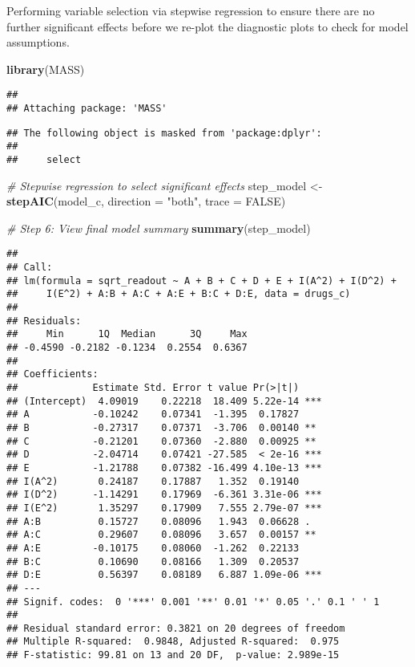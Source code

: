 \documentclass[
]{article}
\newenvironment{Shaded}{\begin{snugshade}}{\end{snugshade}}
\newcommand{\AttributeTok}[1]{\textcolor[rgb]{0.13,0.29,0.53}{#1}}
\newcommand{\CommentTok}[1]{\textcolor[rgb]{0.56,0.35,0.01}{\textit{#1}}}
\newcommand{\ConstantTok}[1]{\textcolor[rgb]{0.56,0.35,0.01}{#1}}
\newcommand{\FunctionTok}[1]{\textcolor[rgb]{0.13,0.29,0.53}{\textbf{#1}}}
\newcommand{\NormalTok}[1]{#1}
\newcommand{\OtherTok}[1]{\textcolor[rgb]{0.56,0.35,0.01}{#1}}
\newcommand{\StringTok}[1]{\textcolor[rgb]{0.31,0.60,0.02}{#1}}
\begin{document}
Performing variable selection via stepwise regression to ensure there
are no further significant effects before we re-plot the diagnostic
plots to check for model assumptions.

\begin{Shaded}
\begin{Highlighting}[]
\FunctionTok{library}\NormalTok{(MASS)}
\end{Highlighting}
\end{Shaded}

\begin{verbatim}
## 
## Attaching package: 'MASS'
\end{verbatim}

\begin{verbatim}
## The following object is masked from 'package:dplyr':
## 
##     select
\end{verbatim}

\begin{Shaded}
\begin{Highlighting}[]
\CommentTok{\# Stepwise regression to select significant effects}
\NormalTok{step\_model }\OtherTok{\textless{}{-}} \FunctionTok{stepAIC}\NormalTok{(model\_c, }\AttributeTok{direction =} \StringTok{"both"}\NormalTok{, }\AttributeTok{trace =} \ConstantTok{FALSE}\NormalTok{)}

\CommentTok{\# Step 6: View final model summary}
\FunctionTok{summary}\NormalTok{(step\_model)}
\end{Highlighting}
\end{Shaded}

\begin{verbatim}
## 
## Call:
## lm(formula = sqrt_readout ~ A + B + C + D + E + I(A^2) + I(D^2) + 
##     I(E^2) + A:B + A:C + A:E + B:C + D:E, data = drugs_c)
## 
## Residuals:
##     Min      1Q  Median      3Q     Max 
## -0.4590 -0.2182 -0.1234  0.2554  0.6367 
## 
## Coefficients:
##             Estimate Std. Error t value Pr(>|t|)    
## (Intercept)  4.09019    0.22218  18.409 5.22e-14 ***
## A           -0.10242    0.07341  -1.395  0.17827    
## B           -0.27317    0.07371  -3.706  0.00140 ** 
## C           -0.21201    0.07360  -2.880  0.00925 ** 
## D           -2.04714    0.07421 -27.585  < 2e-16 ***
## E           -1.21788    0.07382 -16.499 4.10e-13 ***
## I(A^2)       0.24187    0.17887   1.352  0.19140    
## I(D^2)      -1.14291    0.17969  -6.361 3.31e-06 ***
## I(E^2)       1.35297    0.17909   7.555 2.79e-07 ***
## A:B          0.15727    0.08096   1.943  0.06628 .  
## A:C          0.29607    0.08096   3.657  0.00157 ** 
## A:E         -0.10175    0.08060  -1.262  0.22133    
## B:C          0.10690    0.08166   1.309  0.20537    
## D:E          0.56397    0.08189   6.887 1.09e-06 ***
## ---
## Signif. codes:  0 '***' 0.001 '**' 0.01 '*' 0.05 '.' 0.1 ' ' 1
## 
## Residual standard error: 0.3821 on 20 degrees of freedom
## Multiple R-squared:  0.9848, Adjusted R-squared:  0.975 
## F-statistic: 99.81 on 13 and 20 DF,  p-value: 2.989e-15
\end{verbatim}
\end{document}
